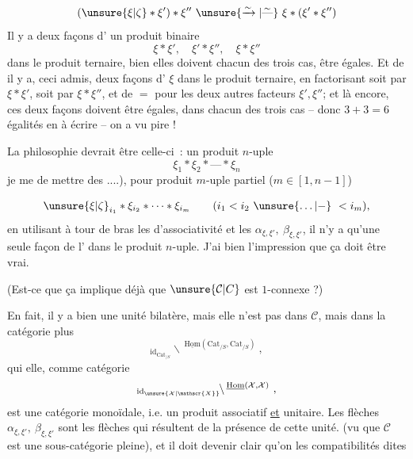 
\[
(\unsure{\xi|\zeta}*\xi')*\xi''\ \unsure{\xrightarrow{\sim}|\overset{\sim}{\text{---}}}\ \xi*(\xi'*\xi'')
\]
Il  y a deux façons d' un produit binaire
\[
\xi*\xi',\quad \xi'*\xi'',\quad \xi*\xi''
\]
dans le produit ternaire,  bien elles doivent  chacun des trois cas, être égales. Et de  il y a, ceci admis,  deux façons d' $\xi$ dans le produit ternaire, en factorisant soit par $\xi*\xi'$, soit par $\xi*\xi''$, et de $=$ pour les deux autres facteurs $\xi',\xi''$; et là encore, ces deux façons doivent être égales, dans chacun des  trois cas -- donc $3+3=6$ égalités en  à écrire  -- on a vu pire !

La philosophie  devrait être celle-ci~:  un produit $n$-uple
\[
\xi_1*\xi_2*\text{---}*\xi_n
\]
 je me  de mettre des  ....), pour  produit $m$-uple partiel ($m\in[1,n-1]$)

\[
\unsure{\xi|\zeta}_{i_1}*\xi_{i_2}*\cdots*\xi_{i_m}\qquad(i_1<i_2\ \unsure{\ldots|{-}}\ <i_m),
\]
en utilisant à tour de bras les  d'associativité et les $\alpha_{\xi,\xi'},\ \beta_{\xi,\xi'}$, il n'y a  qu'une seule façon de l' dans le produit $n$-uple. J'ai bien l'impression que ça doit être vrai.

(Est-ce que ça implique déjà que $\unsure{\mathcal{C}|C}$ est $1$-connexe ?)

En fait, il y a bien une unité bilatère, mais elle n'est pas dans $\mathcal{C}$, mais dans la catégorie plus  
\[
{}_{\mathrm{id}_{\mathrm{Cat}_{/S}}}\!\backslash\,{}^{\underline{\mathrm{Hom}}(\mathrm{Cat}_{/S},\mathrm{Cat}_{/S})}\ ,
\]
qui elle, comme  catégorie
\[
{}_{\mathrm{id}_{\unsure{\mathcal{X}|\mathscr{X}}}}\!\backslash\,{}^{\underline{\mathrm{Hom}}(\mathcal{X},\mathcal{X})}\ ,
\]
est une catégorie monoïdale, i.e. un produit associatif \uline{et} unitaire. Les  flèches $\alpha_{\xi,\xi'},\ \beta_{\xi,\xi'}$ sont les flèches qui résultent de la présence de cette unité. (vu que $\mathcal{C}$ est une sous-catégorie pleine), et  il doit devenir clair qu'on  les compatibilités dites

